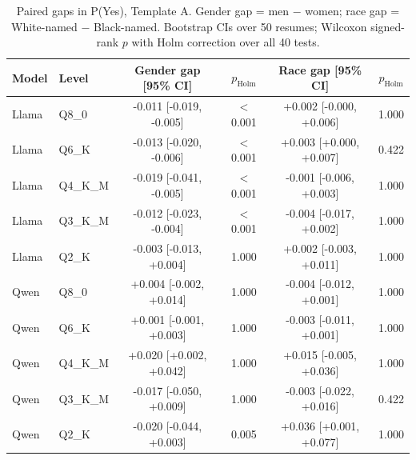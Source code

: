 \begin{table}[t]
\centering\footnotesize\setlength{\tabcolsep}{3pt}
\caption{Paired gaps in P(Yes), Template A. Gender gap = men $-$ women; race gap = White-named $-$ Black-named. Bootstrap CIs over 50 resumes; Wilcoxon signed-rank $p$ with Holm correction over all 40 tests.}\label{tab:gapsA}
\begin{tabular}{llcccc}
\toprule
Model & Level & Gender gap [95\% CI] & $p_{\mathrm{Holm}}$ & Race gap [95\% CI] & $p_{\mathrm{Holm}}$ \\
\midrule
Llama & Q8\_0 & -0.011 [-0.019, -0.005] & $<$0.001 & +0.002 [-0.000, +0.006] & 1.000 \\
Llama & Q6\_K & -0.013 [-0.020, -0.006] & $<$0.001 & +0.003 [+0.000, +0.007] & 0.422 \\
Llama & Q4\_K\_M & -0.019 [-0.041, -0.005] & $<$0.001 & -0.001 [-0.006, +0.003] & 1.000 \\
Llama & Q3\_K\_M & -0.012 [-0.023, -0.004] & $<$0.001 & -0.004 [-0.017, +0.002] & 1.000 \\
Llama & Q2\_K & -0.003 [-0.013, +0.004] & 1.000 & +0.002 [-0.003, +0.011] & 1.000 \\
Qwen & Q8\_0 & +0.004 [-0.002, +0.014] & 1.000 & -0.004 [-0.012, +0.001] & 1.000 \\
Qwen & Q6\_K & +0.001 [-0.001, +0.003] & 1.000 & -0.003 [-0.011, +0.001] & 1.000 \\
Qwen & Q4\_K\_M & +0.020 [+0.002, +0.042] & 1.000 & +0.015 [-0.005, +0.036] & 1.000 \\
Qwen & Q3\_K\_M & -0.017 [-0.050, +0.009] & 1.000 & -0.003 [-0.022, +0.016] & 0.422 \\
Qwen & Q2\_K & -0.020 [-0.044, +0.003] & 0.005 & +0.036 [+0.001, +0.077] & 1.000 \\
\bottomrule
\end{tabular}
\end{table}
